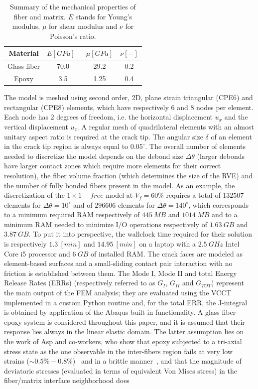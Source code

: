 \begin{table}[!htbp]
 \centering
 \caption{Summary of the mechanical properties of fiber and matrix. $E$ stands for Young's modulus, $\mu$ for shear modulus and $\nu$ for Poisson's ratio.}
 \begin{tabular}{cccc}
\\
\textbf{Material} & \textbf{$E\left[GPa\right]$}\ & \textbf{$\mu\left[GPa\right]$} & \textbf{$\nu\left[-\right]$} \\
\midrule
Glass fiber    & 70.0  & 29.2   & 0.2  \\
Epoxy    & 3.5    & 1.25   & 0.4
\end{tabular}
\label{paperB:tab:phaseprop}
\end{table}

The model is meshed using second order, 2D, plane strain triangular (CPE6) and rectangular (CPE8) elements, which have respectively $6$ and $8$ nodes per element. Each node has $2$ degrees of freedom, i.e. the horizontal displacement $u_{x}$ and the vertical displacement $u_{z}$. A regular mesh of quadrilateral elements with an almost unitary aspect ratio is required at the crack tip. The angular size $\delta$ of an element in the crack tip region is always equal to $0.05^{\circ}$. The overall number of elements needed to discretize the model depends on the debond size $\Delta\theta$ (larger debonds have larger contact zones which require more elements for their correct resolution), the fiber volume fraction (which determines the size of the RVE) and the number of fully bonded fibers present in the model. As an example, the discretization of the $1\times 1-free$ model at $V_{f}=60\%$ requires a total of $132507$ elements for $\Delta\theta=10^{\circ}$ and of $296606$ elements for $\Delta\theta=140^{\circ}$, which corresponds to a minimum required RAM respectively of $445\ MB$ and $1014\ MB$ and to a minimum RAM needed to minimize I/O operations respectively of $1.63\ GB$ and $3.87\ GB$. To put it into perspective, the wallclock time required for their solution is respectively  $1.3\ \left[min\right]$ and $14.95\ \left[min\right]$ on a laptop with a $2.5\ GHz$ Intel Core i5 processor and $6\ GB$ of installed RAM. The crack faces are modeled as element-based surfaces and a small-sliding contact pair interaction with no friction is established between them. The Mode I, Mode II and total Energy Release Rates (ERRs) (respectively referred to as $G_{I}$, $G_{II}$ and $G_{TOT}$) represent the main output of the FEM analysis; they are evaluated using the VCCT~\cite{Krueger2004} implemented in a custom Python routine and, for the total ERR, the J-integral~\cite{Rice1968} is obtained by application of the Abaqus built-in functionality. A glass fiber-epoxy system is considered throughout this paper, and it is assumed that their response lies always in the linear elastic domain. The latter assumption lies on the work of Asp and co-workers, who show that epoxy subjected to a tri-axial stress state as the one observable in the inter-fibers region fails at very low strains ($\sim0.5\%-0.8\%$)~\cite{Asp1995} and in a brittle manner~\cite{Asp1996}, and that the magnitude of deviatoric stresses (evaluated in terms of equivalent Von Mises stress) in the fiber/matrix interface neighborhood does 